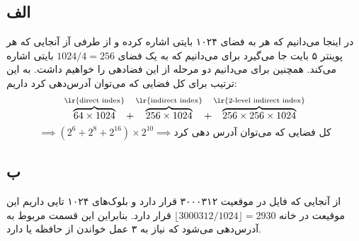 \subsection*{الف}
در اینجا می‌دانیم که هر
به فضای ۱۰۲۴ بایتی اشاره کرده و از طرفی آز آنجایی که هر پوینتر ۵ بایت جا می‌گیرد برای
می‌دانیم که به یک فضای 
$1024/4 = 256$ 
بایتی اشاره می‌کند. همچنین برای 
می‌دانیم دو مرحله از این فضادهی را خواهیم داشت. به این ترتیب برای کل فضایی که می‌توان آدرس‌دهی کرد داریم:
\[
    \overbrace{64 \times 1024}^{\text{\lr{direct index}}} + \overbrace{256 \times 1024}^{\text{\lr{indirect index}}} + \overbrace{256 \times 256 \times 1024}^{\text{\lr{2-level indirect index}}}
\]
\[
    \implies (2^6 + 2^8 + 2^16) \times 2^10 \implies \text{کل فضایی که می‌توان آدرس دهی کرد}
\]

\subsection*{ب}
از آنجایی که فایل در موقعیت 
۳۰۰۰۳۱۲
قرار دارد و بلوک‌های ۱۰۲۴ تایی‌ داریم این موقیعت در خانه
\linebreak
$\lfloor 3000312 / 1024 \rfloor = 2930$
قرار دارد. بنا‌براین این قسمت مربوط به آدرس‌دهی
می‌شود که نیاز به ۳ عمل خواندن از حافظه یا 
دارد.